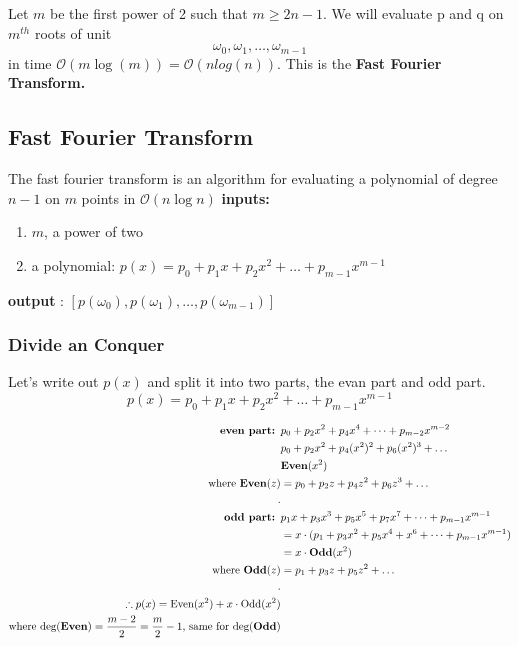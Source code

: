 \documentclass[12pt]{article}
\renewcommand{\O}{\mathcal{O}}
\begin{document}
Let $m$ be the first power of 2 such that $m \ge 2n - 1$. We will evaluate p and q on {\color{red} $m^{th}$} roots of unit
$$
    {\omega_0, \omega_1, \dots, \omega_{m - 1}}
$$
in time $\O(m \log(m)) = \O(nlog(n))$. This is the \textbf{Fast Fourier Transform.}

\subsection*{Fast Fourier Transform}
The fast fourier transform is an algorithm for evaluating a polynomial of degree $n - 1$ on $m$ points in $\O(n\log n)$
\textbf{inputs:}
\begin{enumerate}
    \item $m$, a power of two
    \item a polynomial: $p(x) = p_0 + p_1 x + p_2 x^2 + \dots + p_{m-1}x^{m - 1}$
\end{enumerate}
\textbf{output }: $[p(\omega_0), p(\omega_1), \dots, p(\omega_{m - 1})]$


\subsubsection*{Divide an Conquer}
Let's write out $p(x)$ and split it into two parts, the evan part and odd part.
$$
    p(x) = p_0 + p_1 x + p_2 x^2 + \dots + p_{m-1}x^{m - 1}
$$

\begin{align*}
    \text{\textbf{even part: }}   & p_0 + p_2x^2 + p_4x^4 + \dots + p_{m - 2}x^{m - 2}                \\
                                  & p_0 + p_2x^2 + p_4(x^2)^2 + p_6(x^2)^3 + \dots                    \\
                                  & \text{\textbf{Even}}(x^2)                                         \\
    \text{where \textbf{Even}}(z) & = p_0 + p_2z + p_4z^2 + p_6z^3 + \dots                            \\
    .                                                                                                 \\
    \text{\textbf{odd part: }}    & p_1x + p_3x^3 + p_5x^5 + p_7x^7 + \dots + p_{m - 1}x^{m - 1}      \\
                                  & =x\cdot(p_1 + p_3x^2 + p_5x^4 + x^6 + \dots + p_{m - 1}x^{m - 1}) \\
                                  & =x \cdot \text{\textbf{Odd}}(x^2)                                 \\
    \text{ where \textbf{Odd}}(z) & = p_1 + p_3z + p_5 z^2 + \dots                                    \\
    .                                                                                                 \\
    \therefore p(x) = \text{Even}(x^2) + x \cdot \text{Odd}(x^2)                                      \\
    \text{where deg(\textbf{Even})} = \frac{m - 2}{2} = \frac{m}{2} - 1 \text{, same for deg(\textbf{Odd})}
\end{align*}
\end{document}
